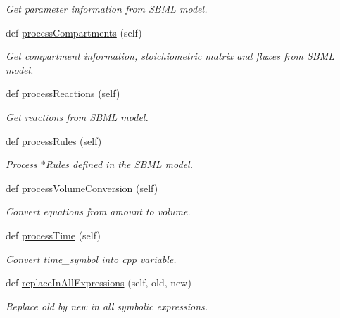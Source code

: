 \begin{DoxyCompactItemize}
\begin{DoxyCompactList}\small\item\em Get parameter information from S\+B\+ML model. \end{DoxyCompactList}\item 
def \mbox{\hyperlink{classamici_1_1sbml__import_1_1_sbml_importer_a526afc71a857e7fdefb4754fc2f93882}{process\+Compartments}} (self)
\begin{DoxyCompactList}\small\item\em Get compartment information, stoichiometric matrix and fluxes from S\+B\+ML model. \end{DoxyCompactList}\item 
def \mbox{\hyperlink{classamici_1_1sbml__import_1_1_sbml_importer_adbdd8e9af99679633109829d94b3fd3e}{process\+Reactions}} (self)
\begin{DoxyCompactList}\small\item\em Get reactions from S\+B\+ML model. \end{DoxyCompactList}\item 
def \mbox{\hyperlink{classamici_1_1sbml__import_1_1_sbml_importer_a7df6b4ae4e3e757bc8de5e0cc54fe16b}{process\+Rules}} (self)
\begin{DoxyCompactList}\small\item\em Process $\ast$\+Rules defined in the S\+B\+ML model. \end{DoxyCompactList}\item 
def \mbox{\hyperlink{classamici_1_1sbml__import_1_1_sbml_importer_af2a2cbf8550d30fc0e95a875758b8262}{process\+Volume\+Conversion}} (self)
\begin{DoxyCompactList}\small\item\em Convert equations from amount to volume. \end{DoxyCompactList}\item 
def \mbox{\hyperlink{classamici_1_1sbml__import_1_1_sbml_importer_a2819c6ad1b541e49e728aa172e57208e}{process\+Time}} (self)
\begin{DoxyCompactList}\small\item\em Convert time\+\_\+symbol into cpp variable. \end{DoxyCompactList}\item 
def \mbox{\hyperlink{classamici_1_1sbml__import_1_1_sbml_importer_a1579faf8b188de11ed58ddbebc3c20a7}{replace\+In\+All\+Expressions}} (self, old, new)
\begin{DoxyCompactList}\small\item\em Replace \textquotesingle{}old\textquotesingle{} by \textquotesingle{}new\textquotesingle{} in all symbolic expressions. \end{DoxyCompactList}\item 

\end{DoxyCompactItemize}
